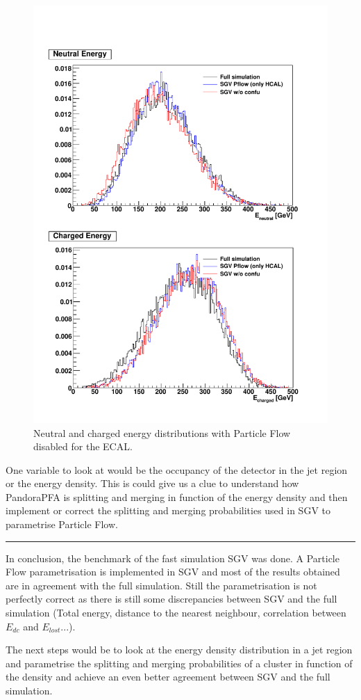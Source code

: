 \begin{figure}[htbp!]
  \centering
  \includegraphics[width=1\linewidth]{Appendixes/fig_SGV/Total_EneuEcha_notjet_onlyHCAL.pdf}
  \caption{Neutral and charged energy distributions with Particle Flow disabled for the ECAL.}
  \label{fig:energy_ECALnoPFA}
\end{figure}

One variable to look at would be the occupancy of the detector in the jet region or the energy density. This is could give us a clue to understand how PandoraPFA is splitting and merging in function of the energy density and then implement or correct the splitting and merging probabilities used in SGV to parametrise Particle Flow.

\begin{center}
\rule{0.5\textwidth}{.4pt}
\end{center}

In conclusion, the benchmark of the fast simulation SGV was done. A Particle Flow parametrisation is implemented in SGV and most of the results obtained are in agreement with the full simulation. Still the parametrisation is not perfectly correct as there is still some discrepancies between SGV and the full simulation (Total energy, distance to the nearest neighbour, correlation between $E_{dc}$ and $E_{lost}$...).

The next steps would be to look at the energy density distribution in a jet region and parametrise the splitting and merging probabilities of a cluster in function of the density and achieve an even better agreement between SGV and the full simulation.
